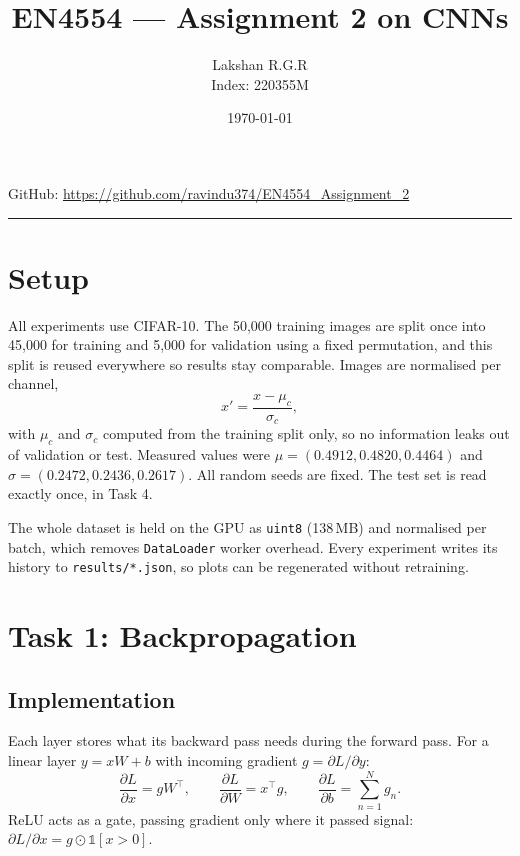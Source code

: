 \documentclass[11pt,a4paper]{article}
\title{\vspace{-1.5cm}\textbf{EN4554 --- Assignment 2 on CNNs}}
\author{Lakshan R.G.R \\ Index: 220355M}
\date{\today}
\begin{document}
\maketitle

\begin{center}
\small
GitHub: \url{https://github.com/ravindu374/EN4554_Assignment_2}
\end{center}

\vspace{-0.5em}
\hrule
\vspace{1em}

\section{Setup}

All experiments use CIFAR-10. The 50{,}000 training images are split once into
45{,}000 for training and 5{,}000 for validation using a fixed permutation, and
this split is reused everywhere so results stay comparable. Images are
normalised per channel,
%
\begin{equation}
x' = \frac{x - \mu_c}{\sigma_c},
\end{equation}
%
with $\mu_c$ and $\sigma_c$ computed from the training split only, so no
information leaks out of validation or test. Measured values were
$\mu = (0.4912, 0.4820, 0.4464)$ and $\sigma = (0.2472, 0.2436, 0.2617)$. All
random seeds are fixed. The test set is read exactly once, in Task 4.

The whole dataset is held on the GPU as \texttt{uint8} (138\,MB) and normalised
per batch, which removes \texttt{DataLoader} worker overhead. Every experiment
writes its history to \texttt{results/*.json}, so plots can be regenerated
without retraining.

\section{Task 1: Backpropagation}

\subsection{Implementation}

Each layer stores what its backward pass needs during the forward pass. For a
linear layer $y = xW + b$ with incoming gradient $g = \partial L/\partial y$:
%
\begin{equation}
\frac{\partial L}{\partial x} = g W^{\!\top}, \qquad
\frac{\partial L}{\partial W} = x^{\!\top} g, \qquad
\frac{\partial L}{\partial b} = \sum_{n=1}^{N} g_n .
\end{equation}
%
ReLU acts as a gate, passing gradient only where it passed signal:
$\partial L/\partial x = g \odot \mathbb{1}[x>0]$.
\end{document}
